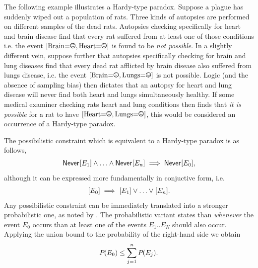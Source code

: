 \newcommand{\smiley}{\textrm{\Smiley}}
\newcommand{\frowny}{\textrm{\Frowny}}

The following example illustrates a Hardy-type paradox. Suppose a plague has suddenly wiped out a population of rats. Three kinds of autopsies are performed on different samples of the dead rats. Autopsies checking specifically for heart and brain disease find that every rat suffered from at least one of those conditions %
i.e. the event $[\mathrm{Brain}\eql\smiley,\mathrm{Heart}\eql\smiley]$ is found to be \emph{not possible}. In a slightly different vein, suppose further that autopsies specifically checking for brain and lung diseases find that every dead rat afflicted by brain disease also suffered from lungs disease, i.e. the event $[\mathrm{Brain}\eql\frowny,\mathrm{Lungs}\eql\smiley]$ is not possible. Logic (and the absence of sampling bias) then dictates that an autopsy for heart and lung disease will never find both heart and lungs simultaneously healthy. If some medical examiner checking rats heart and lung conditions then finds that \emph{it is possible} for a rat to have $[\mathrm{Heart}\eql\smiley,\mathrm{Lungs}\eql\smiley]$, this would be considered an occurrence of a Hardy-type paradox.


The possibilistic constraint which is equivalent to a Hardy-type paradox is as follows,
\begin{align}
    {\operatorname{\mathsf{Never}}_{}}\lbrack E_1\rbrack \land \ldots \land {\operatorname{\mathsf{Never}}_{}}\lbrack E_n\rbrack \implies {\operatorname{\mathsf{Never}}_{}}\lbrack E_0\rbrack,
\end{align}
although it can be expressed more fundamentally in conjuctive form, i.e.
\begin{align}
    {\operatorname{\mathsf{}}_{}}\lbrack E_0\rbrack \implies {\operatorname{\mathsf{}}_{}}\lbrack E_1\rbrack \lor \ldots \lor {\operatorname{\mathsf{}}_{}}\lbrack E_n\rbrack.
\end{align}
Any possibilistic constraint can be immediately translated into a stronger probabilistic one, as noted by \citet{Mansfield2012}. The probabilistic variant states than \emph{whenever} the event $E_0$ occurs than at least one of the events $E_1 .. E_N$ should also occur. Applying the union bound to the probability of the right-hand side we obtain
\begin{align}
{P_{}}\lparen E_0\rparen\leq \sum\limits_{j=1}^n{{P_{}}\lparen E_j\rparen}.
\end{align}

